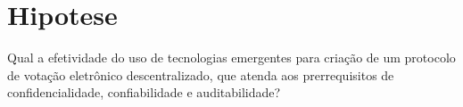 \chapter{Hipotese}
Qual a efetividade do uso de tecnologias emergentes para criação de um protocolo de votação eletrônico descentralizado, que atenda aos prerrequisitos de confidencialidade, confiabilidade e auditabilidade?